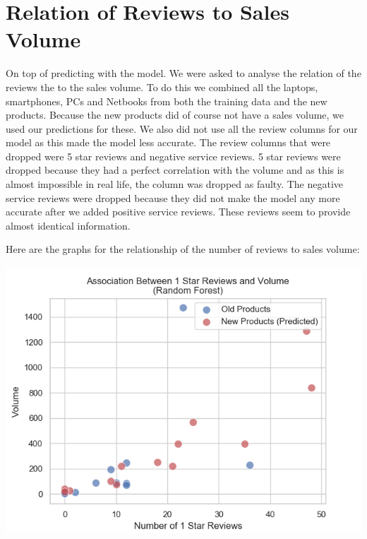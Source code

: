 \documentclass[12pt,a4paper,leqno]{report}
\theoremstyle{plain}
\theoremstyle{definition}
\theoremstyle{remark}
\begin{document}
\section{Relation of Reviews to Sales Volume}

On top of predicting with the model. We were asked to analyse the relation of the reviews
the to the sales volume. To do this we combined all the laptops, smartphones, PCs and Netbooks
from both the training data and the new products. Because the new products did of course
not have a sales volume, we used our predictions for these. We also did not use
all the review columns for our model as this made the model less accurate. The review columns
that were dropped were 5 star reviews and negative service reviews. 5 star reviews
were dropped because they had a perfect correlation with the volume and as this is
almost impossible in real life, the column was dropped as faulty. The negative service
reviews were dropped because they did not make the model any more accurate after
we added positive service reviews. These reviews seem to provide almost identical
information.

Here are the graphs for the relationship of the number of reviews to sales volume:

\bigskip
{
    \centering
    \includegraphics[width=\textwidth,height=\textheight,keepaspectratio]{volume_x1StarReviews_relation.png}
    \par
}
\bigskip
\end{document}
